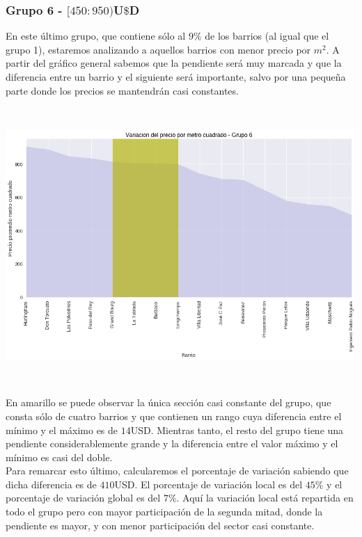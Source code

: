 \documentclass[a4paper, 10pt]{article}
\newcommand\tab[1][0.5cm]{\hspace*{#1}}
\begin{document}
				\subsubsection{Grupo 6 - $[450:950)$U$\$$D}
					En este último grupo, que contiene sólo al $9\%$ de los barrios (al igual que el grupo 1), estaremos analizando
					a aquellos barrios con menor precio por $m^2$. A partir del gráfico general sabemos que la pendiente será muy
					marcada y que la diferencia entre un barrio y el siguiente será importante, salvo por una pequeña parte donde
					los precios se mantendrán casi constantes.
					\begin{center}
   		    				\includegraphics[width=6in, height=4.13in]{images/m2Group6Area}
				  	\end{center}
					\tab En amarillo se puede observar la única sección casi constante del grupo, que consta sólo de cuatro barrios
					y que contienen un rango cuya diferencia entre el mínimo y el máximo es de $14$USD. Mientras tanto, el resto
					del grupo tiene una pendiente considerablemente grande y la diferencia entre el valor máximo y el mínimo es casi
					del doble. \\
					\tab Para remarcar esto último, calcularemos el porcentaje de variación sabiendo que dicha diferencia es de
					$410$USD. El porcentaje de variación local es del $45\%$ y el porcentaje de variación global es del $7\%$. Aquí
					la variación local está repartida en todo el grupo pero con mayor participación de la segunda mitad, donde la
					pendiente es mayor, y con menor participación del sector casi constante.
\end{document}
